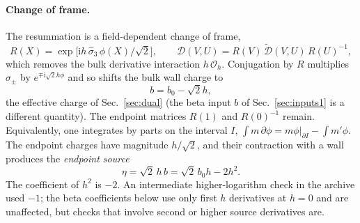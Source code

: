 \documentclass[11pt,a4paper]{article}
\numberwithin{equation}{section}
\newcommand{\Oh}{\mathcal O_h}
\begin{document}
\paragraph{Change of frame.} The resummation is a field-dependent change of frame,
\begin{equation}
 R(X)=\exp\bigl[\mathrm ih\,\hat\sigma_3\,\phi(X)/\sqrt2\bigr],\qquad
 \mathcal D(V,U)=R(V)\,\widetilde{\mathcal D}(V,U)\,R(U)^{-1},
\end{equation}
which removes the bulk derivative interaction $h\,\Oh$. Conjugation by $R$ multiplies $\hat\sigma_\pm$ by
$e^{\mp\mathrm i\sqrt2h\phi}$ and so shifts the bulk wall charge to
\begin{equation}
 b=b_0-\sqrt2h,
\end{equation}
the effective charge of Sec.~\ref{sec:dual} (the beta input $b$ of Sec.~\ref{sec:inputs1} is a different
quantity). The endpoint matrices $R(1)$ and $R(0)^{-1}$ remain. Equivalently, one integrates by parts on the
interval $I$, $\int m\,\partial\phi=m\phi|_{\partial I}-\int m'\phi$. The endpoint charges have magnitude $h/\sqrt2$,
and their contraction with a wall produces the \emph{endpoint source}
\begin{equation}
 \eta=\sqrt2\,h\,b=\sqrt2\,b_0h-2h^2.
 \label{eq:dualA:eta}
\end{equation}
The coefficient of $h^2$ is $-2$. An intermediate higher-logarithm check in the archive used $-1$; the beta
coefficients below use only first $h$ derivatives at $h=0$ and are unaffected, but checks that involve second or
higher source derivatives are.
\end{document}
